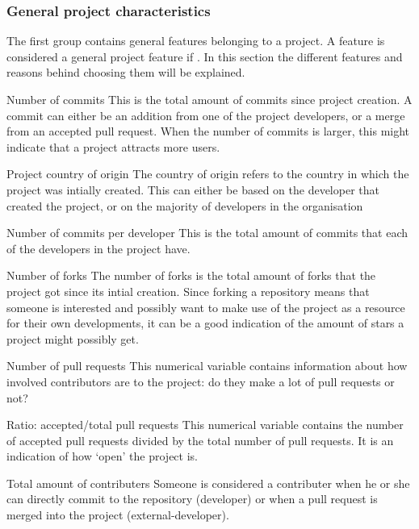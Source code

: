     \subsubsection{General project characteristics}
    The first group contains general features belonging to a project. 
    A feature is considered a general project feature if .
    In this section the different features and reasons behind choosing them will be explained.
    \begin{LaTeXdescription}
        \item[Number of commits]
        This is the total amount of commits since project creation.
        A commit can either be an addition from one of the project developers, or a merge from an accepted pull request.
        When the number of commits is larger, this might indicate that a project attracts more users.
        \item[Project country of origin]
        The country of origin refers to the country in which the project was intially created.
        This can either be based on the developer that created the project, or on the majority of developers in the organisation
        \item[Number of commits per developer]
        This is the total amount of commits that each of the developers in the project have.
        \item[Number of forks]
        The number of forks is the total amount of forks that the project got since its intial creation.
        Since forking a repository means that someone is interested and possibly want to make use of the project as a resource for their own developments, it can be a good indication of the amount of stars a project might possibly get.
        \item[Number of pull requests]
        This numerical variable contains information about how involved contributors are to the project: do they make a lot of pull requests or not?
        \item[Ratio: accepted/total pull requests]
        This numerical variable contains the number of accepted pull requests divided by the total number of pull requests. It is an indication of how `open' the project is.
        \item[Total amount of contributers]
        Someone is considered a contributer when he or she can directly commit to the repository (developer) or when a pull request is merged into the project (external-developer).

\end{LaTeXdescription}
